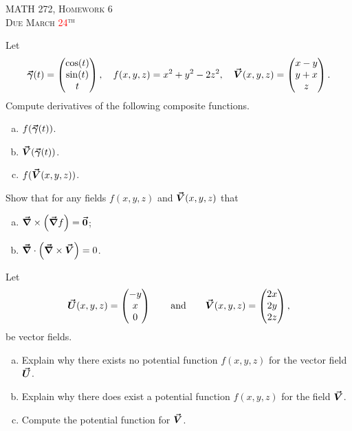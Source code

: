 \documentclass[12pt]{article} %
\begin{document}
\begin{center}
   \textsc{\large MATH 272, Homework 6}\\
   \textsc{Due March \textcolor{red}{24}$^\textrm{th}$}
\end{center}
\vspace{.5cm}


\begin{problem} 
Let 
\[
\boldsymbol{\vec{\gamma}}(t) = \begin{pmatrix} \cos(t) \\ \sin(t) \\ t \end{pmatrix}, \quad f(x,y,z) = x^2 + y^2 - 2z^2, \quad \boldsymbol{\vec{V}}(x,y,z) = \begin{pmatrix} x-y \\ y+x \\ z \end{pmatrix}.
\]
Compute derivatives of the following composite functions.
\begin{enumerate}[(a)]
	\item $f(\boldsymbol{\vec{\gamma}}(t))$.
	\item $\boldsymbol{\vec{V}}(\boldsymbol{\vec{\gamma}}(t))$.
	\item $f(\boldsymbol{\vec{V}}(x,y,z))$.
\end{enumerate}
\end{problem}

\begin{problem}
Show that for any fields $f(x,y,z)$ and $\boldsymbol{\vec{V}}(x,y,z)$ that
\begin{enumerate}[(a)]
	\item $\boldsymbol{\vec{\nabla}} \times \left(\boldsymbol{\vec{\nabla}} f\right)=\boldsymbol{\vec{0}}$;
	\item $\boldsymbol{\vec{\nabla}} \cdot \left(\boldsymbol{\vec{\nabla}} \times \boldsymbol{\vec{V}}\right)=0$.
\end{enumerate}
\end{problem}

\begin{problem}
	Let 
	\[
	\boldsymbol{\vec{U}}(x,y,z) = \begin{pmatrix} -y \\ x \\ 0 \end{pmatrix} \qquad \textrm{and} \qquad \boldsymbol{\vec{V}}(x,y,z) = \begin{pmatrix} 2x \\ 2y \\ 2z \end{pmatrix},
	\] 
	be vector fields.  
	\begin{enumerate}[(a)]
		\item Explain why there exists no potential function $f(x,y,z)$ for the vector field $\boldsymbol{\vec{U}}$.
		\item Explain why there does exist a potential function $f(x,y,z)$ for the field $\boldsymbol{\vec{V}}$.
		\item Compute the potential function for $\boldsymbol{\vec{V}}$.
	\end{enumerate}
\end{problem}
\end{document}
